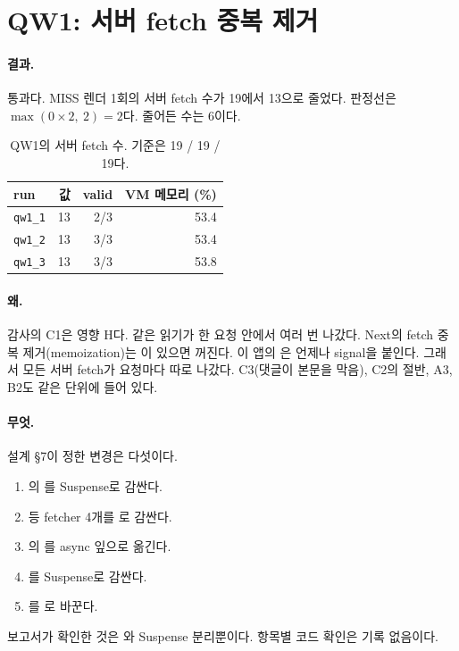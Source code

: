 \section{QW1: 서버 fetch 중복 제거}\label{sec:re-qw1}

\paragraph{결과.}
통과다. MISS 렌더 1회의 서버 fetch 수가 19에서 13으로 줄었다.
판정선은 $\max(0\times 2,\ 2)=2$다. 줄어든 수는 6이다.

\begin{table}[H]
  \caption{QW1의 서버 fetch 수. 기준은 19 / 19 / 19다.}
  \label{tab:re-qw1}
  \centering\small
  \begin{tabularx}{\linewidth}{@{}L{2.2cm} r r r@{}}
    \toprule
    run & 값 & valid & VM 메모리 (\%) \\
    \midrule
    \texttt{qw1\_1} & 13 & 2/3 & 53.4 \\
    \midrule
    \texttt{qw1\_2} & 13 & 3/3 & 53.4 \\
    \midrule
    \texttt{qw1\_3} & 13 & 3/3 & 53.8 \\
    \bottomrule
  \end{tabularx}
\end{table}

\paragraph{왜.}
감사의 C1은 영향 H다. 같은 읽기가 한 요청 안에서 여러 번 나갔다.
Next의 fetch 중복 제거(memoization)는 이 있으면 꺼진다.
이 앱의 은 언제나 signal을 붙인다.
그래서 모든 서버 fetch가 요청마다 따로 나갔다.
C3(댓글이 본문을 막음), C2의  절반, A3, B2도 같은 단위에 들어 있다.

\paragraph{무엇.}
설계 \S7이 정한 변경은 다섯이다.
\begin{enumerate}[nosep]
  \item {}의 를 Suspense로 감싼다.
  \item {} 등 fetcher 4개를 로 감싼다.
  \item {}의 를 async 잎으로 옮긴다.
  \item {}를 Suspense로 감싼다.
  \item {}를 로 바꾼다.
\end{enumerate}
보고서가 확인한 것은 와 Suspense 분리뿐이다.
항목별 코드 확인은 기록 없음이다.

